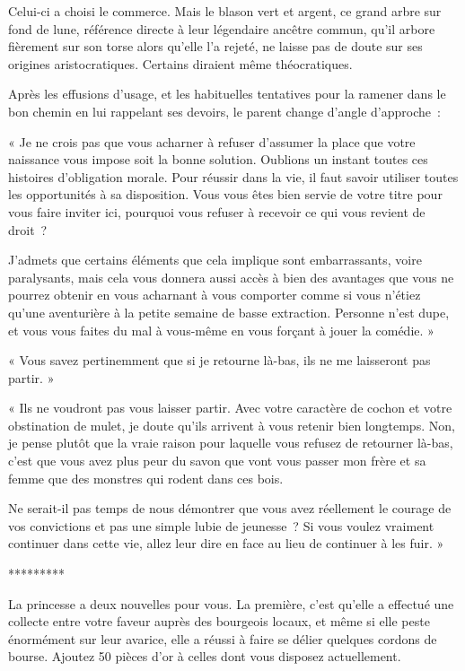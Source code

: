 \documentclass{report}
\newcommand{\ellipse}{
    \begin{center}
        *********
    \end{center}
}
\begin{document}
Celui-ci a choisi le commerce. Mais le blason vert et argent, ce grand arbre sur fond de lune, référence directe à leur légendaire ancêtre commun, qu'il arbore fièrement sur son torse alors qu'elle l'a rejeté, ne laisse pas de doute sur ses origines aristocratiques. Certains diraient même théocratiques.

Après les effusions d'usage, et les habituelles tentatives pour la ramener dans le bon chemin en lui rappelant ses devoirs, le parent change d'angle d'approche :

« Je ne crois pas que vous acharner à refuser d'assumer la place que votre naissance vous impose soit la bonne solution. Oublions un instant toutes ces histoires d'obligation morale. Pour réussir dans la vie, il faut savoir utiliser toutes les opportunités à sa disposition. Vous vous êtes bien servie de votre titre pour vous faire inviter ici, pourquoi vous refuser à recevoir ce qui vous revient de droit ?

J'admets que certains éléments que cela implique sont embarrassants, voire paralysants, mais cela vous donnera aussi accès à bien des avantages que vous ne pourrez obtenir en vous acharnant à vous comporter comme si vous n'étiez qu'une aventurière à la petite semaine de basse extraction. Personne n'est dupe, et vous vous faites du mal à vous-même en vous forçant à jouer la comédie. »

« Vous savez pertinemment que si je retourne là-bas, ils ne me laisseront pas partir. »

« Ils ne voudront pas vous laisser partir. Avec votre caractère de cochon et votre obstination de mulet, je doute qu'ils arrivent à vous retenir bien longtemps. Non, je pense plutôt que la vraie raison pour laquelle vous refusez de retourner là-bas, c'est que vous avez plus peur du savon que vont vous passer mon frère et sa femme que des monstres qui rodent dans ces bois.

Ne serait-il pas temps de nous démontrer que vous avez réellement le courage de vos convictions et pas une simple lubie de jeunesse ? Si vous voulez vraiment continuer dans cette vie, allez leur dire en face au lieu de continuer à les fuir. »

\ellipse

La princesse a deux nouvelles pour vous. La première, c'est qu'elle a effectué une collecte entre votre faveur auprès des bourgeois locaux, et même si elle peste énormément sur leur avarice, elle a réussi à faire se délier quelques cordons de bourse. Ajoutez 50 pièces d'or à celles dont vous disposez actuellement.
\end{document}
